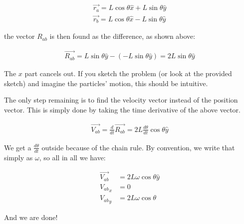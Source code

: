 \documentclass[8.01x]{subfiles}
\begin{document}
\begin{align}
\vec{r_a} = L \cos \theta \hat{x} + L \sin \theta \hat{y}\\
\vec{r_b} = L \cos \theta \hat{x} - L \sin \theta \hat{y}
\end{align}

the vector $R_{ab}$ is then found as the difference, as shown above:

\begin{align}
\vec{R_{ab}} = L \sin \theta \hat{y} - (-L \sin \theta \hat{y}) = 2 L \sin \theta \hat{y}
\end{align}

The $x$ part cancels out. If you sketch the problem (or look at the provided sketch) and imagine the particles' motion, this should be intuitive.

The only step remaining is to find the velocity vector instead of the position vector. This is simply done by taking the time derivative of the above vector.

\begin{align}
\vec{V_{ab}} = \frac{d}{dt} \vec{R_{ab}} = 2 L \frac{d\theta}{dt} \cos \theta \hat{y}
\end{align}

We get a $\displaystyle \frac{d\theta}{dt}$ outside because of the chain rule. By convention, we write that simply as $\omega$, so all in all we have:

\begin{align}
\vec{V_{ab}} &= 2 L \omega \cos \theta \hat{y}\\
{V_{ab}}_x &= 0\\
{V_{ab}}_y &= 2 L \omega \cos \theta
\end{align}

And we are done!
\end{document}
